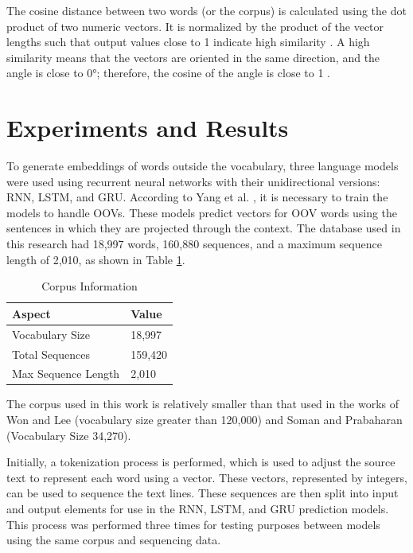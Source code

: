 \documentclass[conference]{IEEEtran}
\begin{document}
The cosine distance between two words (or the corpus) is calculated using the dot product of two numeric vectors. It is normalized by the product of the vector lengths such that output values close to 1 indicate high similarity \cite{b8}. A high similarity means that the vectors are oriented in the same direction, and the angle is close to 0°; therefore, the cosine of the angle is close to 1 \cite{b7}.


\section{Experiments and Results}

To generate embeddings of words outside the vocabulary, three language models were used using recurrent neural networks with their unidirectional versions: RNN, LSTM, and GRU. According to Yang et al. \cite{b20}, it is necessary to train the models to handle OOVs. These models predict vectors for OOV words using the sentences in which they are projected through the context. The database used in this research had 18,997 words, 160,880 sequences, and a maximum sequence length of 2,010, as shown in Table \ref{tab1}.

\begin{table}[htbp]
\caption{Corpus Information}
\begin{center}
\begin{tabular}{|ll|}
\hline
\multicolumn{1}{|l|}{\textbf{Aspect}}     & \textbf{Value} \\ \hline
\multicolumn{1}{|l|}{Vocabulary Size}     & 18,997 \\ \hline
\multicolumn{1}{|l|}{Total Sequences}     & 159,420 \\ \hline
\multicolumn{1}{|l|}{Max Sequence Length} & 2,010   \\ \hline
\end{tabular}
\label{tab1}
\end{center}
\end{table}

The corpus used in this work is relatively smaller than that used in the works of Won and Lee \cite{b14} (vocabulary size greater than 120,000) and Soman and Prabaharan \cite{b6} (Vocabulary Size 34,270).

Initially, a tokenization process is performed, which is used to adjust the source text to represent each word using a vector. These vectors, represented by integers, can be used to sequence the text lines. These sequences are then split into input and output elements for use in the RNN, LSTM, and GRU prediction models. This process was performed three times for testing purposes between models using the same corpus and sequencing data.
\end{document}
